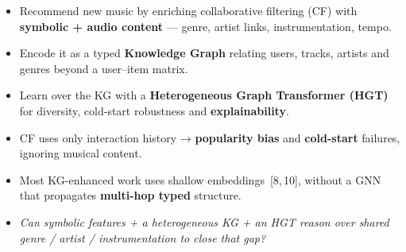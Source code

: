 \documentclass[a1paper, 14pt]{extarticle}
\begin{document}
\begin{minipage}[t]{0.48\textwidth}\vspace{0pt}

  \begin{tcolorbox}[posterbox, title=Objectives]
    \begin{itemize}
    \item Recommend new music by enriching collaborative filtering (CF) with \textbf{symbolic + audio content} — genre, artist links, instrumentation, tempo.
    \item Encode it as a typed \textbf{Knowledge Graph} relating users, tracks, artists and genres beyond a user–item matrix.
    \item Learn over the KG with a \textbf{Heterogeneous Graph Transformer (HGT)} for diversity, cold-start robustness and \textbf{explainability}.
    \end{itemize}
  \end{tcolorbox}

  \begin{tcolorbox}[posterbox, title=Problem]
    \begin{itemize}
      \item CF uses only interaction history → \textbf{popularity bias} and \textbf{cold-start} failures, ignoring musical content.
      \item Most KG-enhanced work uses shallow embeddings~[8,\,10], without a GNN that propagates \textbf{multi-hop typed} structure.
      \item \textit{Can symbolic features + a heterogeneous KG + an HGT reason over shared genre / artist / instrumentation to close that gap?}
    \end{itemize}
  \end{tcolorbox}


\end{minipage}
\end{document}
